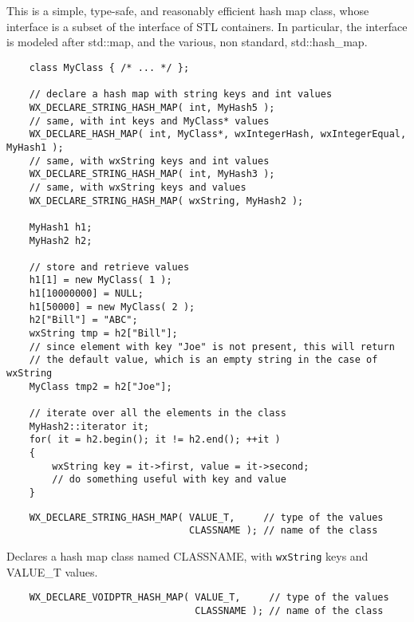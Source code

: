 \section{}\label{wxhashmap}

This is a simple, type-safe, and reasonably efficient hash map class,
whose interface is a subset of the interface of STL containers. In
particular, the interface is modeled after std::map, and the various,
non standard, std::hash\_map.


\begin{verbatim}
    class MyClass { /* ... */ };

    // declare a hash map with string keys and int values
    WX_DECLARE_STRING_HASH_MAP( int, MyHash5 );
    // same, with int keys and MyClass* values
    WX_DECLARE_HASH_MAP( int, MyClass*, wxIntegerHash, wxIntegerEqual, MyHash1 );
    // same, with wxString keys and int values
    WX_DECLARE_STRING_HASH_MAP( int, MyHash3 );
    // same, with wxString keys and values
    WX_DECLARE_STRING_HASH_MAP( wxString, MyHash2 );

    MyHash1 h1;
    MyHash2 h2;

    // store and retrieve values
    h1[1] = new MyClass( 1 );
    h1[10000000] = NULL;
    h1[50000] = new MyClass( 2 );
    h2["Bill"] = "ABC";
    wxString tmp = h2["Bill"];
    // since element with key "Joe" is not present, this will return
    // the default value, which is an empty string in the case of wxString
    MyClass tmp2 = h2["Joe"];

    // iterate over all the elements in the class
    MyHash2::iterator it;
    for( it = h2.begin(); it != h2.end(); ++it )
    {
        wxString key = it->first, value = it->second;
        // do something useful with key and value
    }
\end{verbatim}


\begin{verbatim}
    WX_DECLARE_STRING_HASH_MAP( VALUE_T,     // type of the values
                                CLASSNAME ); // name of the class
\end{verbatim}

Declares a hash map class named CLASSNAME, with {\tt wxString} keys
and VALUE\_T values.

\begin{verbatim}
    WX_DECLARE_VOIDPTR_HASH_MAP( VALUE_T,     // type of the values
                                 CLASSNAME ); // name of the class
\end{verbatim}

